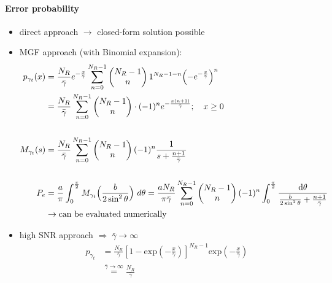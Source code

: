 \documentclass[a4paper, 10pt]{article}
\begin{document}
\paragraph{Error probability}
	\begin{itemize}
		\item direct approach $\rightarrow$ closed-form solution possible
		\item MGF approach (with Binomial expansion):
			\begin{align*}
				p_{\gamma _t}(x) &= \frac{N_R}{\bar{\gamma}}e^{-\frac{x}{\bar{\gamma}}}\sum_{n = 0}^{N_R - 1}\begin{pmatrix} N_R - 1 \\ n\end{pmatrix} 1^{N_R - 1 - n}\Bigl( -e^{-\frac{x}{\bar{\gamma}}}\Bigr)^n \\ 
				&= \frac{N_R}{\bar{\gamma}}\sum_{n = 0}^{N_R - 1}\begin{pmatrix}N_R - 1 \\ n\end{pmatrix}\cdot (-1)^{n}e^{-\frac{x(n + 1)}{\bar{\gamma}}};\quad	x \geq 0 \\ \\
				M_{\gamma_t}(s) &= \frac{N_R}{\bar{\gamma}}\sum_{n = 0}^{N_R - 1}\begin{pmatrix}N_R - 1\\n\end{pmatrix}(-1)^{n}\frac{1}{s + \frac{n+1}{\bar{\gamma}}}\\ \\
				P_e &= \frac{a}{\pi}\int_{0}^{\frac{\pi}{2}}M_{\gamma _t}\Bigl(\frac{b}{2\sin^2\theta}\Bigr)~d\theta = \frac{aN_R}{\pi\bar{\gamma}}\sum_{n = 0}^{N_R - 1}\begin{pmatrix}N_R - 1\\ n\end{pmatrix} (-1)^{n}\int_{0}^{\frac{\pi}{2}}\frac{\mathrm{d}\theta}{\frac{b}{2\sin^2\theta} + \frac{n + 1}{\bar{\gamma}}}\\ &\rightarrow\text{can be evaluated numerically}				
			\end{align*}
		\item high SNR approach $\Rightarrow \; \bar{\gamma}\rightarrow\infty$
			\begin{align*}
			p_{\gamma_t}
			&=\frac{N_R}{\bar{\gamma}}
			\left[1-\mathrm{exp}\left(-\frac{x}{\bar{\gamma}}\right)\right]^{N_R-1}\mathrm{exp}\left(-\frac{x}{\bar{\gamma}}\right)\\
			&\overset{\bar{\gamma} \rightarrow \infty}{=} \frac{N_R}{\bar{\gamma}}

\end{align*}
\end{itemize}
\end{document}
